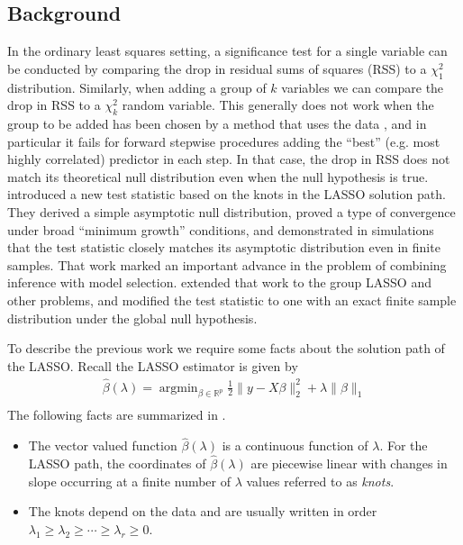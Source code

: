 \documentclass{imsart}
\newcommand{\argmin}{\mathop{\mathrm{argmin}}}
\newcommand{\real}{\mathbb{R}}
\begin{document}
\subsection{Background}
In the ordinary least squares setting, a significance test for a
single variable can be conducted by comparing the drop in residual
sums of squares (RSS) to a $\chi^2_1$ distribution. Similarly, when
adding a group of $k$ variables we can compare the drop in RSS to a
$\chi^2_k$ random variable. This generally does not work when the
group to be added has been chosen by a method that uses the data
\citep{olshen:flevel},
and in particular it fails for forward stepwise procedures adding
the ``best'' (e.g. most highly correlated) predictor in each step. In
that case, the drop in RSS does not match its
theoretical null distribution even when the null hypothesis is
true. \cite{significance:lasso} introduced a new test statistic based
on the knots in the LASSO solution path. They derived a simple
asymptotic null distribution, proved a type of convergence under broad
``minimum growth'' conditions, and demonstrated in simulations that
the test statistic closely matches its asymptotic distribution even in
finite samples.  That work marked an important advance in the problem
of combining inference with model selection.  \cite{tests:adaptive}
extended that work to the group LASSO \citep{grouplasso} and other
problems, and modified the test statistic to one with an exact finite
sample distribution under the global null hypothesis.

To describe the previous work we require some facts about the solution path
of the LASSO.
Recall the LASSO estimator is given by
\begin{equation}
\begin{aligned}
\label{eq:lasso}
\displaystyle \hat \beta(\lambda) = \argmin_{\beta \in \real^p} \frac{1}{2} \| y - X \beta \|_2^2 +
   \lambda \| \beta \|_1 \\
\end{aligned}
\end{equation}
The following facts are summarized in \cite{significance:lasso,tibshirani_LASSO_uniqueness}.

\begin{itemize}

  \item The vector valued function $\hat \beta(\lambda)$ is a
    continuous function of $\lambda$. For the LASSO path, the
    coordinates of $\hat \beta(\lambda)$ are piecewise linear with
    changes in slope occurring at a finite number of $\lambda$ values
    referred to as \emph{knots}. 
    \item The knots depend on the data and are
    usually written in order $\lambda_1 \geq \lambda_2 \geq \cdots
    \geq \lambda_r \geq 0$. 

\end{itemize}
\end{document}
